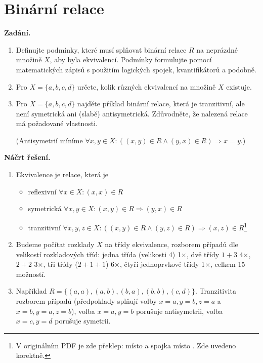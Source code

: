 \section{Binární relace}

\noindent\textbf{Zadání.}\par
\begin{enumerate}
  \item Definujte podmínky, které musí splňovat binární relace $R$ na neprázdné množině $X$, aby byla ekvivalencí. Podmínky formulujte pomocí matematických zápisů s použitím logických spojek, kvantifikátorů a podobně.
  \item Pro $X = \{a, b, c, d\}$ určete, kolik různých ekvivalencí na množině $X$ existuje.
  \item Pro $X = \{a, b, c, d\}$ najděte příklad binární relace, která je tranzitivní, ale není symetrická ani (slabě) antisymetrická. Zdůvodněte, že nalezená relace má požadované vlastnosti.

  (Antisymetrií míníme $\forall x, y \in X : ((x, y) \in R \wedge (y, x) \in R) \Rightarrow x = y$.)
\end{enumerate}

\medskip
\noindent\textbf{Náčrt řešení.}\par
\begin{enumerate}
  \item Ekvivalence je relace, která je
    \begin{itemize}
      \item reflexivní $\forall x \in X : (x, x) \in R$
      \item symetrická $\forall x, y \in X : (x, y) \in R \Rightarrow (y, x) \in R$
      \item tranzitivní $\forall x, y, z \in X : ((x, y) \in R \wedge (y, z) \in R) \Rightarrow (x, z) \in R$\footnote{V originálním PDF je zde překlep:  místo  a spojka \uv{$\vee$} místo \uv{$\wedge$}. Zde uvedeno korektně.}
    \end{itemize}
  \item Budeme počítat rozklady $X$ na třídy ekvivalence, rozborem případů dle velikostí rozkladových tříd: jedna třída (velikosti 4) 1$\times$, dvě třídy $1 + 3$ 4$\times$, $2 + 2$ 3$\times$, tři třídy ($2 + 1 + 1$) 6$\times$, čtyři jednoprvkové třídy 1$\times$, celkem 15 možností.
  \item Například $R = \{(a, a), (a, b), (b, a), (b, b), (c, d)\}$. Tranzitivita rozborem případů (předpoklady splňují volby $x = a, y = b, z = a$ a $x = b, y = a, z = b$), volba $x = a, y = b$ porušuje antisymetrii, volba $x = c, y = d$ porušuje symetrii.
\end{enumerate}

